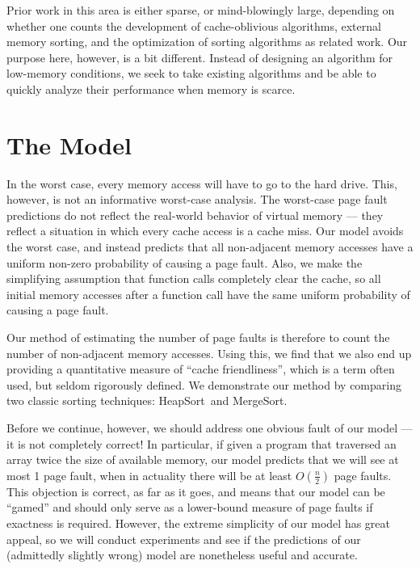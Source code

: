 \documentclass{acmtrans2m}
\newcommand{\heapsort}{{\sc HeapSort}}
\newcommand{\mergesort}{{\sc MergeSort}}
\begin{document}
Prior work in this area is either sparse, or mind-blowingly large, depending on
whether one counts the development of cache-oblivious algorithms\cite{cacheo},
external memory sorting, and the optimization of sorting
algorithms\cite{314324,radix} as related work.  Our purpose here, however, is a
bit different.  Instead of designing an algorithm for low-memory conditions, we
seek to take existing algorithms and be able to quickly analyze their
performance when memory is scarce.


\section{The Model}
\label{model}

In the worst case, every memory access will have to go to the hard drive.
This, however, is not an informative worst-case analysis.  The worst-case page
fault predictions do not reflect the real-world behavior of virtual memory ---
they reflect a situation in which every cache access is a cache miss. Our model
avoids the worst case, and instead predicts that all non-adjacent memory
accesses have a uniform non-zero probability of causing a page fault.  Also, we
make the simplifying assumption that function calls completely clear the cache,
so all initial memory accesses after a function call have the same uniform
probability of causing a page fault.

Our method of estimating the number of page faults is therefore to count the
number of non-adjacent memory accesses.  Using this, we find that we also end
up providing a quantitative measure of ``cache friendliness'', which is a term
often used, but seldom rigorously defined.  We demonstrate our method by
comparing two classic sorting techniques: \heapsort\ and \mergesort.

Before we continue, however, we should address one obvious fault of our
model --- it is not completely correct!  In particular, if given a program that
traversed an array twice the size of available memory, our model predicts that
we will see at most 1 page fault, when in actuality there will be at least
$O(\frac{n}{2})$ page faults.  This objection is correct, as far as it goes,
and means that our model can be ``gamed'' and should only serve as a
lower-bound measure of page faults if exactness is required.  However, the
extreme simplicity of our model has great appeal, so we will conduct
experiments and see if the predictions of our (admittedly slightly wrong) model
are nonetheless useful and accurate.
\end{document}
